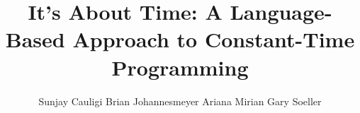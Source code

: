 \documentclass{sig-alternate-10pt}
\begin{document}
\title{It's About Time: A Language-Based Approach to Constant-Time Programming}

\author{
\alignauthor%
Sunjay Cauligi\qquad
Brian Johannesmeyer\qquad
Ariana Mirian\qquad
Gary Soeller\qquad
\smallskip\\\\%
}

\maketitle
\thispagestyle{empty}

\newcommand{\update}[1]{{\color{blue}#1}\xspace}

\newcommand{\twolinecell}[2][r]{%
  \begin{tabular}[#1]{@{}c@{}}#2\end{tabular}}


\pagestyle{plain}
\thispagestyle{empty}













\end{document}
